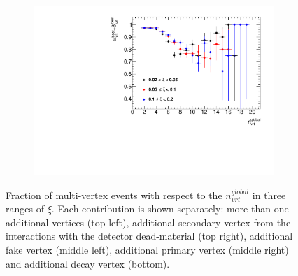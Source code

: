 \begin{figure}[h!]
\begin{subfigure}{.49\textwidth}
		\includegraphics[width=\textwidth,page=7]{chapters/chrgSTAR/img/vertex/vertexEffi_ksi.pdf}
	\end{subfigure}
	\begin{minipage}{.49\textwidth}
			\caption[Fraction of multi-vertex events  with respect to the $n_{vrt}^{global}$ in three ranges of $\xi$.]{Fraction of multi-vertex events  with respect to the $n_{vrt}^{global}$ in three ranges of $\xi$. Each contribution is shown separately: more than one additional vertices (top left), additional secondary vertex from the interactions with the detector dead-material (top right), additional fake vertex (middle left), additional primary vertex (middle right) and additional decay vertex (bottom).}
			\label{fig:vertexVeto}
	\end{minipage}

\end{figure}

